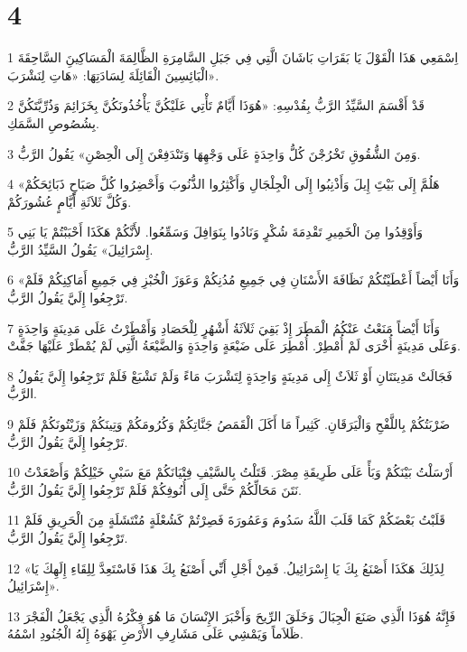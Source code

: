 \chapter{4}

\par 1 اِسْمَعِي هَذَا الْقَوْلَ يَا بَقَرَاتِ بَاشَانَ الَّتِي فِي جَبَلِ السَّامِرَةِ الظَّالِمَةَ الْمَسَاكِينَِ السَّاحِقَةَ الْبَائِسِينَ الْقَائِلَةَ لِسَادَتِهَا: «هَاتِ لِنَشْرَبَ».
\par 2 قَدْ أَقْسَمَ السَّيِّدُ الرَّبُّ بِقُدْسِهِ: «هُوَذَا أَيَّامٌ تَأْتِي عَلَيْكُنَّ يَأْخُذُونَكُنَّ بِخَزَائِمَ وَذُرِّيَّتَكُنَّ بِشُصُوصِ السَّمَكِ.
\par 3 وَمِنَ الشُّقُوقِ تَخْرُجْنَ كُلُّ وَاحِدَةٍ عَلَى وَجْهِهَا وَتَنْدَفِعْنَ إِلَى الْحِصْنِ» يَقُولُ الرَّبُّ.
\par 4 «هَلُمَّ إِلَى بَيْتَِ إِيلَ وَأَذْنِبُوا إِلَى الْجِلْجَالِ وَأَكْثِرُوا الذُّنُوبَ وَأَحْضِرُوا كُلَّ صَبَاحٍ ذَبَائِحَكُمْ وَكُلَّ ثَلاَثَةِ أَيَّامٍ عُشُورَكُمْ.
\par 5 وَأَوْقِدُوا مِنَ الْخَمِيرِ تَقْدِمَةَ شُكْرٍ وَنَادُوا بِنَوَافِلَ وَسَمِّعُوا. لأَنَّكُمْ هَكَذَا أَحْبَبْتُمْ يَا بَنِي إِسْرَائِيلَ» يَقُولُ السَّيِّدُ الرَّبُّ.
\par 6 «وَأَنَا أَيْضاً أَعْطَيْتُكُمْ نَظَافَةَ الأَسْنَانِ فِي جَمِيعِ مُدُنِكُمْ وَعَوَزَ الْخُبْزِ فِي جَمِيعِ أَمَاكِنِكُمْ فَلَمْ تَرْجِعُوا إِلَيَّ يَقُولُ الرَّبُّ.
\par 7 وَأَنَا أَيْضاً مَنَعْتُ عَنْكُمُ الْمَطَرَ إِذْ بَقِيَ ثَلاَثَةُ أَشْهُرٍ لِلْحَصَادِ وَأَمْطَرْتُ عَلَى مَدِينَةٍ وَاحِدَةٍ وَعَلَى مَدِينَةٍ أُخْرَى لَمْ أُمْطِرْ. أُمْطِرَ عَلَى ضَيْعَةٍ وَاحِدَةٍ وَالضَّيْعَةُ الَّتِي لَمْ يُمْطَرْ عَلَيْهَا جَفَّتْ.
\par 8 فَجَالَتْ مَدِينَتَانِ أَوْ ثَلاَثٌ إِلَى مَدِينَةٍ وَاحِدَةٍ لِتَشْرَبَ مَاءً وَلَمْ تَشْبَعْ فَلَمْ تَرْجِعُوا إِلَيَّ يَقُولُ الرَّبُّ.
\par 9 ضَرْبَتُكُمْ بِاللَّفْحِ وَالْيَرَقَانِ. كَثِيراً مَا أَكَلَ الْقَمَصُ جَنَّاتِكُمْ وَكُرُومَكُمْ وَتِينَكُمْ وَزَيْتُونَكُمْ فَلَمْ تَرْجِعُوا إِلَيَّ يَقُولُ الرَّبُّ.
\par 10 أَرْسَلْتُ بَيْنَكُمْ وَبَأً عَلَى طَرِيقَةِ مِصْرَ. قَتَلْتُ بِالسَّيْفِ فِتْيَانَكُمْ مَعَ سَبْيِ خَيْلِكُمْ وَأَصْعَدْتُ نَتَنَ مَحَالِّكُمْ حَتَّى إِلَى أُنُوفِكُمْ فَلَمْ تَرْجِعُوا إِلَيَّ يَقُولُ الرَّبُّ.
\par 11 قَلَبْتُ بَعْضَكُمْ كَمَا قَلَبَ اللَّهُ سَدُومَ وَعَمُورَةَ فَصِرْتُمْ كَشُعْلَةٍ مُنْتَشَلَةٍ مِنَ الْحَرِيقِ فَلَمْ تَرْجِعُوا إِلَيَّ يَقُولُ الرَّبُّ.
\par 12 «لِذَلِكَ هَكَذَا أَصْنَعُ بِكَ يَا إِسْرَائِيلُ. فَمِنْ أَجْلِ أَنِّي أَصْنَعُ بِكَ هَذَا فَاسْتَعِدَّ لِلِقَاءِ إِلَهِكَ يَا إِسْرَائِيلُ».
\par 13 فَإِنَّهُ هُوَذَا الَّذِي صَنَعَ الْجِبَالَ وَخَلَقَ الرِّيحَ وَأَخْبَرَ الإِنْسَانَ مَا هُوَ فِكْرُهُ الَّذِي يَجْعَلُ الْفَجْرَ ظَلاَماً وَيَمْشِي عَلَى مَشَارِفِ الأَرْضِ يَهْوَهُ إِلَهُ الْجُنُودِ اسْمُهُ.

